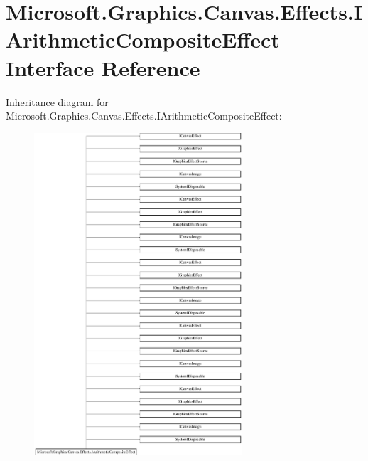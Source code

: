 \hypertarget{interface_microsoft_1_1_graphics_1_1_canvas_1_1_effects_1_1_i_arithmetic_composite_effect}{}\section{Microsoft.\+Graphics.\+Canvas.\+Effects.\+I\+Arithmetic\+Composite\+Effect Interface Reference}
\label{interface_microsoft_1_1_graphics_1_1_canvas_1_1_effects_1_1_i_arithmetic_composite_effect}
Inheritance diagram for Microsoft.\+Graphics.\+Canvas.\+Effects.\+I\+Arithmetic\+Composite\+Effect\+:\begin{figure}[H]
\begin{center}
\leavevmode
\includegraphics[height=12.000000cm]{interface_microsoft_1_1_graphics_1_1_canvas_1_1_effects_1_1_i_arithmetic_composite_effect}
\end{center}
\end{figure}
